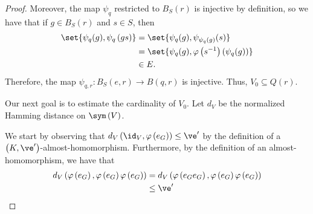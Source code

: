 \documentclass[10pt]{mypackage}
\begin{document}
\begin{proof}
  Moreover, the map $\psi_q$ restricted to $B_S(r)$ is injective by definition, so we have that if $g\in B_S(r)$ and $s\in S$, then
  \begin{align*}
    \set{\psi_q(g),\psi_q\left( gs \right)} &= \set{\psi_q(g),\psi_{\psi_q(g)}(s)}\\
                                            &= \set{\psi_q(g),\varphi\left( s^{-1} \right)\left( \psi_q(g) \right)}\\
                                            &\in E.
  \end{align*}
  Therefore, the map $\psi_{q,r}\colon B_S\left( e,r \right)\rightarrow B\left( q,r \right)$ is injective. Thus, $V_0\subseteq Q(r)$.

  Our next goal is to estimate the cardinality of $V_0$. Let $d_V$ be the normalized Hamming distance on $\sym\left( V \right)$.

  We start by observing that $d_V\left( \id_V,\varphi\left( e_G \right) \right)\leq \ve'$ by the definition of a $\left( K,\ve' \right)$-almost-homomorphism. Furthermore, by the definition of an almost-homomorphism, we have that
  \begin{align*}
    d_V\left( \varphi\left( e_G \right),\varphi\left( e_G \right)\varphi\left( e_G \right) \right) &= d_V\left( \varphi\left( e_Ge_G \right),\varphi\left( e_G \right)\varphi\left( e_G \right) \right)\\
                                                                                                   &\leq \ve'
  \end{align*}
\end{proof}
\nocite{loh_geometric_group_theory,topics_groups_geometry,cellular_automata_and_groups,pestov2008hyperlinearsoficgroupsbrief,pestov2012introductionhyperlinearsoficgroups,brown_and_ozawa}
\printbibliography
\end{document}
